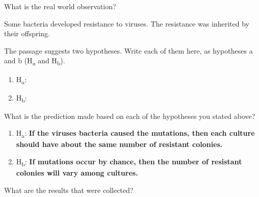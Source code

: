 \documentclass[12pt, addpoints]{exam}
\newcommand*\AnswerBox[2]{%
    \parbox[t][#1]{0.92\textwidth}{%
    \begin{solution}#2\end{solution}}
}
\begin{document}
\begin{questions}

\question[1]
What is the real world observation?

\AnswerBox{4\baselineskip}{%
Some bacteria developed resistance to viruses. The resistance
was inherited by their offspring.}

\question[2]

The passage suggests two hypotheses. Write each of them here, as
hypotheses a and b (H\textsubscript{a} and H\textsubscript{b}).

\begin{enumerate}[label=\alph*.]

	\item H\textsubscript{a}: 
	\fi \vspace*{2\baselineskip}
	
	
	\item H\textsubscript{b}: 
	\fi \vspace*{2\baselineskip}

\end{enumerate}

\newpage

\question[2]
What is the prediction made based on each of the hypotheses you stated
above?

\begin{enumerate}[label=\alph*.]

	\item H\textsubscript{a}:
	\ifprintanswers
		\textbf{If the viruses bacteria caused the mutations, then each 
		culture should have about the same number of resistant colonies.}
		\vspace*{1\baselineskip}
	\else
		\vspace*{2\baselineskip}
	\fi

	\item H\textsubscript{b}:
	\ifprintanswers
		\textbf{If mutations occur by chance, then the number of resistant 
		colonies will vary among cultures.}
		\vspace*{1\baselineskip}
	\else
		\vspace*{2\baselineskip}
	\fi

\end{enumerate}


\question[1]
What are the results that were collected?


\end{questions}
\end{document}
